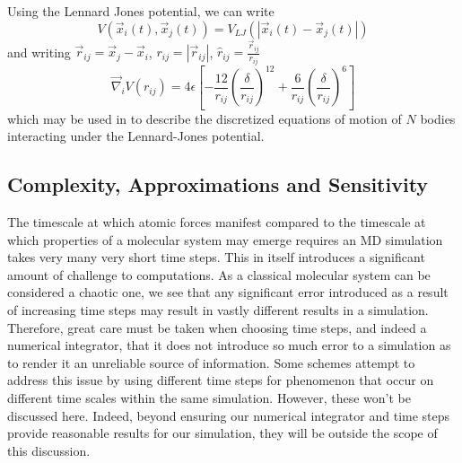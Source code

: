 %
Using the Lennard Jones potential, we can write
\begin{equation}
    V(\vec{x}_i(t), \vec{x}_j(t)) = V_{LJ}(|\vec{x}_i(t) - \vec{x}_j(t)|)
\end  {equation}
and writing $\vec{r}_{ij} = \vec{x}_j - \vec{x}_i$,
$r_{ij} = |\vec{r}_{ij}|$, $\hat{r}_{ij} = \frac{\vec{r}_{ij}}{r_{ij}}$
\begin{equation}
    \vec{\nabla}_i V(r_{ij}) = 4\epsilon \left[
        - \frac{12}{r_{ij}} \left( \frac{\delta}{r_{ij}} \right)^{12}
        + \frac{6}{r_{ij}} \left( \frac{\delta}{r_{ij}} \right)^{6}
    \right]
\end  {equation}
which may be used in  to describe
the discretized equations of motion of $N$ bodies interacting under the
Lennard-Jones potential.


%
%
%


\subsection{Complexity, Approximations and Sensitivity}

The timescale at which atomic forces manifest compared to
the timescale at which properties of a molecular system may emerge
requires an MD simulation takes very many very short time steps.
%
This in itself introduces a significant amount of challenge to computations.
%
As a classical molecular system can be considered a chaotic one,
we see that any significant error introduced as a result of
increasing time steps may result in
vastly different results in a simulation.
%
Therefore, great care must be taken when choosing time steps, and
indeed a numerical integrator,
that it does not introduce so much error to a simulation as to render it
an unreliable source of information.
%
Some schemes attempt to address this issue by
using different time steps for phenomenon that occur on
different time scales within the same simulation.
%
However, these won’t be discussed here.
%
Indeed, beyond ensuring our numerical integrator and time steps provide
reasonable results for our simulation,
they will be outside the scope of this discussion.


